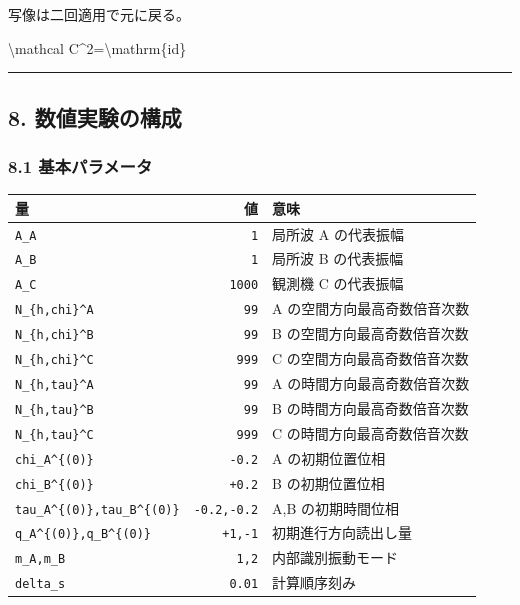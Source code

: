 \documentclass[
  a4paper,
]{article}
\newenvironment{Shaded}{}{}
\newcommand{\NormalTok}[1]{#1}
\newcounter{none} %
\begin{document}
写像は二回適用で元に戻る。

\begin{Shaded}
\begin{Highlighting}[]
\NormalTok{\textbackslash{}mathcal C\^{}2=\textbackslash{}mathrm\{id\}}
\end{Highlighting}
\end{Shaded}

\begin{center}\rule{0.5\linewidth}{0.5pt}\end{center}

\subsection{8.
数値実験の構成}\label{ux6570ux5024ux5b9fux9a13ux306eux69cbux6210}

\subsubsection{8.1
基本パラメータ}\label{ux57faux672cux30d1ux30e9ux30e1ux30fcux30bf}

{\def\LTcaptype{none} %
\begin{longtable}[]{@{}lrl@{}}
\toprule\noalign{}
量 & 値 & 意味 \\
\midrule\noalign{}
\endhead
\bottomrule\noalign{}
\endlastfoot
\texttt{A\_A} & \texttt{1} & 局所波 A の代表振幅 \\
\texttt{A\_B} & \texttt{1} & 局所波 B の代表振幅 \\
\texttt{A\_C} & \texttt{1000} & 観測機 C の代表振幅 \\
\texttt{N\_\{h,chi\}\^{}A} & \texttt{99} & A
の空間方向最高奇数倍音次数 \\
\texttt{N\_\{h,chi\}\^{}B} & \texttt{99} & B
の空間方向最高奇数倍音次数 \\
\texttt{N\_\{h,chi\}\^{}C} & \texttt{999} & C
の空間方向最高奇数倍音次数 \\
\texttt{N\_\{h,tau\}\^{}A} & \texttt{99} & A
の時間方向最高奇数倍音次数 \\
\texttt{N\_\{h,tau\}\^{}B} & \texttt{99} & B
の時間方向最高奇数倍音次数 \\
\texttt{N\_\{h,tau\}\^{}C} & \texttt{999} & C
の時間方向最高奇数倍音次数 \\
\texttt{chi\_A\^{}\{(0)\}} & \texttt{-0.2} & A の初期位置位相 \\
\texttt{chi\_B\^{}\{(0)\}} & \texttt{+0.2} & B の初期位置位相 \\
\texttt{tau\_A\^{}\{(0)\},tau\_B\^{}\{(0)\}} & \texttt{-0.2,-0.2} & A,B
の初期時間位相 \\
\texttt{q\_A\^{}\{(0)\},q\_B\^{}\{(0)\}} & \texttt{+1,-1} &
初期進行方向読出し量 \\
\texttt{m\_A,m\_B} & \texttt{1,2} & 内部識別振動モード \\
\texttt{delta\_s} & \texttt{0.01} & 計算順序刻み \\
\end{longtable}
}
\end{document}
